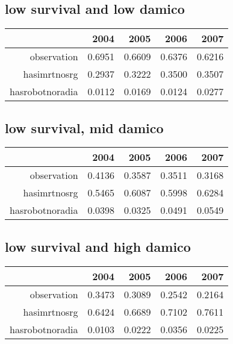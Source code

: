 \documentclass[12pt]{report}
\begin{document}
\subsection{low survival and low damico}
\begin{table}[ht]
\begin{center}
\begin{tabular}{rrrrr}
  \hline
 & 2004 & 2005 & 2006 & 2007 \\ 
  \hline
observation & 0.6951 & 0.6609 & 0.6376 & 0.6216 \\ 
  hasimrtnosrg & 0.2937 & 0.3222 & 0.3500 & 0.3507 \\ 
  hasrobotnoradia & 0.0112 & 0.0169 & 0.0124 & 0.0277 \\ 
   \hline
\end{tabular}
\end{center}
\end{table}

\subsection{low survival, mid damico}

\begin{table}[ht]
\begin{center}
\begin{tabular}{rrrrr}
  \hline
 & 2004 & 2005 & 2006 & 2007 \\ 
  \hline
observation & 0.4136 & 0.3587 & 0.3511 & 0.3168 \\ 
  hasimrtnosrg & 0.5465 & 0.6087 & 0.5998 & 0.6284 \\ 
  hasrobotnoradia & 0.0398 & 0.0325 & 0.0491 & 0.0549 \\ 
   \hline
\end{tabular}
\end{center}
\end{table}

\subsection{low survival and high damico}
\begin{table}[ht]
\begin{center}
\begin{tabular}{rrrrr}
  \hline
 & 2004 & 2005 & 2006 & 2007 \\ 
  \hline
observation & 0.3473 & 0.3089 & 0.2542 & 0.2164 \\ 
  hasimrtnosrg & 0.6424 & 0.6689 & 0.7102 & 0.7611 \\ 
  hasrobotnoradia & 0.0103 & 0.0222 & 0.0356 & 0.0225 \\ 
   \hline
\end{tabular}
\end{center}
\end{table}
\pagebreak
\end{document}
